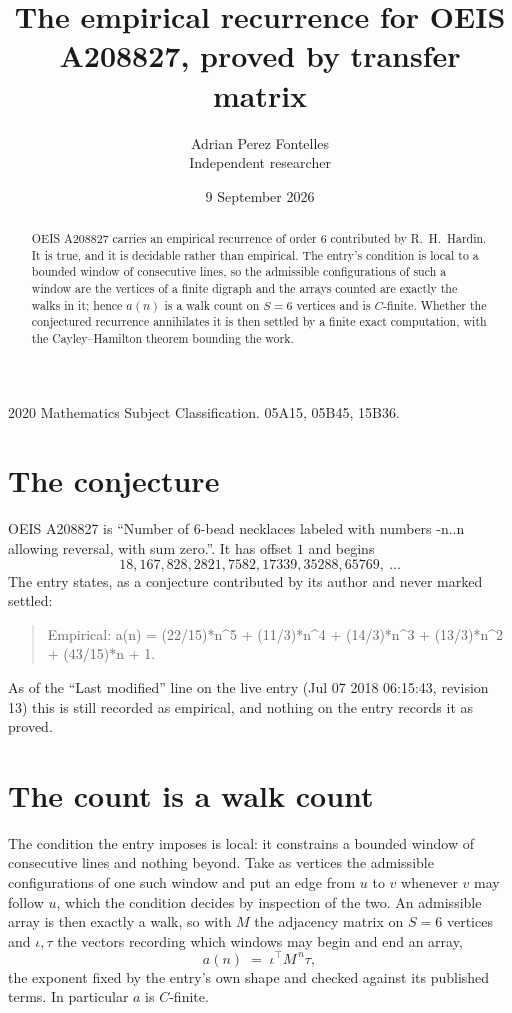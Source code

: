 \documentclass[11pt,a4paper]{article}
\title{The empirical recurrence for OEIS A208827, proved by transfer matrix}
\author{Adrian Perez Fontelles\\ \small Independent researcher}
\date{9 September 2026}
\theoremstyle{plain}
\theoremstyle{definition}
\begin{document}
\maketitle

\begin{abstract}
OEIS A208827 carries an empirical recurrence of order $6$ contributed by R.~H.~Hardin. It is
true, and it is decidable rather than empirical. The entry's condition is local to a bounded window of consecutive lines, so
the admissible configurations of such a window are the vertices of a finite digraph and the
arrays counted are exactly the walks in it; hence $a(n)$ is a walk count on $S=6$ vertices
and is $C$-finite. Whether the conjectured recurrence annihilates it is then settled by a
finite exact computation, with the Cayley--Hamilton theorem bounding the work.
\end{abstract}

\noindent\small 2020 Mathematics Subject Classification. 05A15, 05B45, 15B36.\normalsize

\section{The conjecture}

OEIS A208827 is ``Number of 6-bead necklaces labeled with numbers -n..n allowing reversal, with sum zero.''. It has offset $1$ and begins
\[
18, 167, 828, 2821, 7582, 17339, 35288, 65769,\ \dots
\]
The entry states, as a conjecture contributed by its author and never marked settled:
\begin{quote}
Empirical: a(n) = (22/15)*n\^{}5 + (11/3)*n\^{}4 + (14/3)*n\^{}3 + (13/3)*n\^{}2 + (43/15)*n + 1.
\end{quote}
As of the ``Last modified'' line on the live entry (Jul 07 2018 06:15:43, revision 13) this is still
recorded as empirical, and nothing on the entry records it as proved.

\section{The count is a walk count}

The condition the entry imposes is local: it constrains a bounded window of consecutive lines and nothing beyond. Take as
vertices the admissible configurations of one such window and put an edge from $u$ to $v$
whenever $v$ may follow $u$, which the condition decides by inspection of the two. An
admissible array is then exactly a walk, so with $M$ the adjacency matrix on $S=6$ vertices
and $\iota,\tau$ the vectors recording which windows may begin and end an array,
\[
a(n)\;=\;\iota^{\!\top}M^{\,n}\tau ,
\]
the exponent fixed by the entry's own shape and checked against its published terms. In
particular $a$ is $C$-finite.
\end{document}
